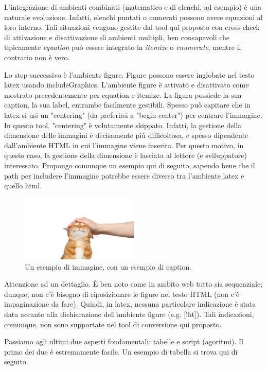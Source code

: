 L'integrazione di ambienti combinati (matematico e di elenchi, ad esempio) è una naturale evoluzione. Infatti, elenchi puntati o numerati possono avere equazioni al loro interno. Tali situazioni vengono gestite dal tool qui proposto con cross-check di attivazione e disattivazione di ambienti multipli, ben consapevoli che tipicamente \textit{equation} può essere integrato in \textit{itemize} o \textit{enumerate}, mentre il contrario non è vero.

Lo step successivo è l'ambiente figure. Figure possono essere inglobate nel testo latex usando includeGraphics. L'ambiente figure è attivato e disattivato come mostrato precedentemente per equation e itemize. La figura possiede la sua caption, la sua label, 
entrambe facilmente gestibili. Spesso può capitare che in latex si usi un "centering" 
(da preferirsi a "begin center") per centrare l'immagine. In questo tool, "centering" è volutamente skippato. Infatti, la gestione della dimensione delle immagini è decisamente più difficoltosa, e spesso dipendente dall'ambiente HTML in cui l'immagine viene inserita. Per questo motivo, in questo caso, la gestione della dimensione è lasciata al lettore (e sviluppatore) interessato. Propongo comunque un esempio qui di seguito, sapendo bene che il path per includere l'immagine potrebbe essere diverso tra l'ambiente latex e quello html. 

\begin{figure}
\centering
\includegraphics[width=0.5\textwidth]{cat.png}
\caption{Un esempio di immagine, con un esempio di caption.}
\end{figure}

Attenzione ad un dettaglio. È ben noto come in ambito web tutto sia sequenziale; dunque, non c'è bisogno di riposizionare le figure nel testo HTML (non c'è impaginazione da fare). Quindi, in latex, nessuna particolare indicazione è stata data accanto alla dichiarazione dell'ambiente figure (e.g. [!ht]). Tali indicazioni, comunque, non sono supportate nel tool di conversione qui proposto.

Passiamo agli ultimi due aspetti fondamentali: tabelle e script (agoritmi). Il primo dei due è estremamente facile. Un esempio di tabella si trova qui di seguito.

